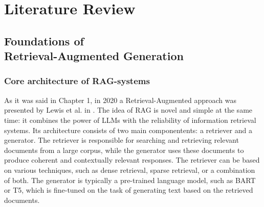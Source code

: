 \chapter{Literature Review}
\label{chap:lr}


\section[Foundations of Retrieval-Augmented Generation]{\texorpdfstring{Foundations of \\ Retrieval-Augmented Generation}{Foundations of Retrieval-Augmented Generation}}
\subsection{Core architecture of RAG-systems}
As it was said in Chapter 1, in 2020 a Retrieval-Augmented approach was presented by Lewis et al. in \cite{lewisRetrievalAugmentedGenerationKnowledgeIntensive2020}.
The idea of RAG is novel and simple at the same time: it combines the power of LLMs with the reliability of information retrieval systems.
Its architecture consists of two main componentents: a retriever and a generator.
The retriever is responsible for searching and retrieving relevant documents from a large corpus, while the generator uses these documents to produce coherent and contextually relevant responses.
The retriever can be based on various techniques, such as dense retrieval, sparse retrieval, or a combination of both.
The generator is typically a pre-trained language model, such as BART or T5, which is fine-tuned on the task of generating text based on the retrieved documents.

